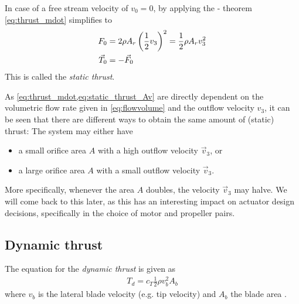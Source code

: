 In case of a free stream velocity of $v_0 = 0$, by applying the - theorem \cref{eq:thrust_mdot} simplifies to
%
\begin{align}
F_{0} &= 2 \rho A_r \left(\frac{1}{2}v_3\right)^2
       = \frac{1}{2} \rho A_r v_3^2 \label{eq:static_thrust_Av} \\
\vec{T}_{0} &= -\vec{F}_{0}
\end{align}
%
This is called the \textit{static thrust}.


As \cref{eq:thrust_mdot,eq:static_thrust_Av} are directly dependent on the volumetric flow rate given in \cref{eq:flowvolume} and the outflow velocity $v_3$, 
it can be seen that there are different ways to obtain the same amount of (static) thrust: The system may either have

\begin{itemize}
	\item a small orifice area $A$ with a high outflow velocity $\vec{v}_{3}$, or
	\item a large orifice area $A$ with a small outflow velocity $\vec{v}_{3}$.
\end{itemize}

More specifically, whenever the area $A$ doubles, the velocity $\vec{v}_{3}$ may halve. 
We will come back to this later, as this has an interesting impact on actuator design decisions, specifically in the choice of motor and propeller pairs.




\subsection{Dynamic thrust}

The equation for the \textit{dynamic thrust} is given as
%
\begin{align}
T_d = c_T \frac{1}{2} \rho v_b^2 A_b
\end{align}
%
where $v_b$ is the lateral blade velocity (e.g. tip velocity) and $A_b$ the blade area \cite[chapter~1.6.3]{physing}.

